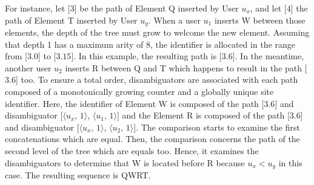 \begin{asparadesc}
  For instance, let [$3$] be the path of Element Q inserted by User $u_x$, and let
  [$4$] the path of Element T inserted by User $u_y$. When a user $u_1$ inserts W
  between those elements, the depth of the tree must grow to welcome the new
  element. Assuming that depth 1 has a maximum arity of 8, the identifier is
  allocated in the range from [$3.0$] to [$3.15$].  In this example, the resulting
  path is [$3.6$]. In the meantime, another user $u_2$ inserts R between Q and T
  which happens to result in the path [$3.6$] too. To ensure a total order,
  disambiguators are associated with each path composed of a monotonically
  growing counter and a globally unique site identifier. Here, the identifier of
  Element W is composed of the path [$3.6$] and disambiguator
  [$\langle u_x,\,1\rangle$, $\langle u_1,\,1\rangle$] and the Element R is composed of
  the path [$3.6$] and disambiguator [$\langle u_x,\,1\rangle$,
  $\langle u_2,\,1\rangle$].  The comparison starts to examine the first
  concatenations which are equal.  Then, the comparison concerns the path of the
  second level of the tree which are equals too. Hence, it examines the
  disambiguators to determine that W is located before R because $u_x < u_y$ in
  this case. The resulting sequence is QWRT.  

\end{asparadesc}



